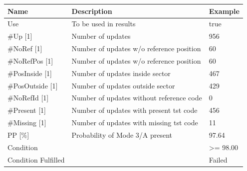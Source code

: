 \begin{center}
 \begin{table}[H]
  \begin{tabularx}{\textwidth}{ | l | X |  l | }
    \hline
    \textbf{Name} & \textbf{Description} & \textbf{Example} \\ \hline
    Use & To be used in results & true \\ \hline
    \#Up [1] & Number of updates & 956 \\ \hline
    \#NoRef [1] & Number of updates w/o reference position & 60 \\ \hline
    \#NoRefPos [1] & Number of updates w/o reference position  & 60 \\ \hline
    \#PosInside [1] & Number of updates inside sector & 467 \\ \hline
    \#PosOutside [1] & Number of updates outside sector & 429 \\ \hline
    \#NoRefId [1] & Number of updates without reference code & 0 \\ \hline
    \#Present [1] & Number of updates with present tst code & 456 \\ \hline
    \#Missing [1] & Number of updates with missing tst code & 11 \\ \hline
    PP [\%] & Probability of Mode 3/A present & 97.64 \\ \hline
    Condition &  & >= 98.00 \\ \hline
    Condition Fulfilled &  & Failed \\ \hline
\end{tabularx}
\end{table}
\end{center}
